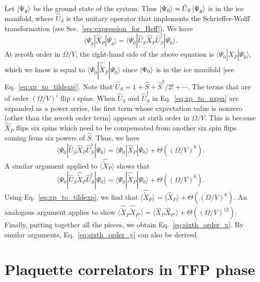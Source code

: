 \documentclass[twocolumn,superscriptaddress,amsmath,amssymb,aps,prx,nofootinbib]{revtex4-2}
\begin{document}
Let $\ket{\Psi_g}$ be the ground state of the system. Thus $\ket{\Psi_0} = \hat{U}_S \ket{\Psi_g}$ is in the ice manifold, where $\hat{U}_S$ is the unitary operator that implements the Schrieffer-Wolff transformation (see Sec.~\ref{sec:expression_for_Heff}).  
We have
\begin{equation}
\label{eq:xp_to_uxpu}
    \langle \Psi_g | \hat{X}_P  | \Psi_g\rangle =     \langle \Psi_0 | \hat{U}_S \hat{X}_P \hat{U}_S^\dagger| \Psi_0\rangle.
\end{equation}
At zeroth order in $\Omega/V$, the right-hand side of the above equation is $\langle \Psi_0 |  \hat{X}_P | \Psi_0\rangle$, which we know is equal to $ \langle \Psi_0 |\hat{\tilde{X}}_P |\Psi_0 \rangle$ since $\ket{\Psi_0}$ is in the ice manifold [see Eq.~\eqref{eq:xp_to_tildexp}]. 
Note that $\hat{U}_S = 1+\hat{S} + \hat{S}^2/2!+ \cdots$. The terms that are of order $(\Omega/V)^i$ flip $i$ spins.
When $\hat{U}_S$ and $\hat{U}_S^\dagger$ in Eq.~\eqref{eq:xp_to_uxpu} are expanded as a power series, the first term whose expectation value is nonzero (other than the zeroth order term) appears at sixth order in $\Omega/V$.
This is because $\hat{X}_P $ flips six spins which need to be compensated from another six spin flips coming from six powers of $\hat{S}$.
Thus, we have 
\begin{equation}
    \langle\Psi_0 | \hat{U}_S \hat{X}_P \hat{U}_S^\dagger| \Psi_0\rangle = \langle\Psi_0 |  \hat{X}_P | \Psi_0\rangle + \Theta \left((\Omega/V)^6\right).
\end{equation}
A similar argument applied to $ \langle \hat{\tilde{X}}_P \rangle$ shows that 
\begin{equation}
    \langle\Psi_0 | \hat{U}_S \hat{\tilde{X}}_P \hat{U}_S^\dagger| \Psi_0\rangle = \langle\Psi_0 |  \hat{\tilde{X}}_P | \Psi_0\rangle + \Theta \left((\Omega/V)^6\right).
\end{equation}
Using Eq.~\eqref{eq:xp_to_tildexp}, we find that $ \langle  \hat{\tilde{X}}_P \rangle = \langle  \hat{X}_P \rangle + \Theta \left((\Omega/V)^6\right)$. 
An analogous argument applies to show  $ \langle  \hat{\tilde{X}}_P \hat{\tilde{X}}_{P'}\rangle = \langle  \hat{X}_P\hat{X}_{P'} \rangle + \Theta \left((\Omega/V)^{12}\right)$. Finally, putting together all the pieces, we obtain Eq.~\eqref{eq:sixth_order_x}. 
By similar arguments, Eq.~\eqref{eq:sixth_order_y} can also be derived.

\section{Plaquette correlators in TFP phase}
\label{app:plaquette_TFP}
\end{document}
